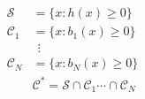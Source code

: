 \documentclass[preview]{standalone}
\begin{document}
\begin{align*}
\mathcal{S} &= \{ x : h(x) \geq 0 \}\\ \mathcal{C}_1 &= \{ x : b_1(x) \geq 0 \}\\ & \ \ \vdots\\  \mathcal{C}_N &= \{ x : b_N(x) \geq 0 \}\\ & \mathcal{C}^* = \mathcal{S} \cap \mathcal{C}_1 \cdots \cap \mathcal{C}_N
\end{align*}
\end{document}
